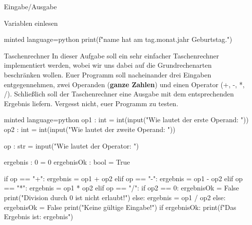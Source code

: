 \begin{task}[points=auto]{Eingabe/Ausgabe }
\begin{subtask*}[points=0]{Variablen einlesen}
\begin{solution}
\begin{codeBlock}[]{minted language=python}
                print(f"{name} hat am {tag}.{monat}.{jahr} Geburtstag.")
            \end{codeBlock}
        \end{solution}
    \end{subtask*}
    \begin{subtask*}[points=0]{Taschenrechner}
        In dieser Aufgabe soll ein sehr einfacher Taschenrechner implementiert werden, wobei wir uns dabei auf die Grundrechenarten beschränken wollen. Euer Programm soll nacheinander drei Eingaben entgegennehmen, zwei Operanden (\textbf{ganze Zahlen}) und einen Operator ({\ttfamily +, -, *, /}). Schließlich soll der Taschenrechner eine Ausgabe mit dem entsprechenden Ergebnis liefern. Vergesst nicht, euer Programm zu testen.

        \begin{solution}
            \begin{codeBlock}[]{minted language=python}
                op1 : int = int(input("Wie lautet der erste Operand: "))
                op2 : int = int(input("Wie lautet der zweite Operand: "))

                op : str = input("Wie lautet der Operator: ")

                ergebnis : 0 = 0
                ergebnisOk : bool = True

                if op == "+":
                    ergebnis = op1 + op2
                elif op == "-":
                    ergebnis = op1 - op2
                elif op == "*":
                    ergebnis = op1 * op2
                elif op == "/":
                    if op2 == 0:
                        ergebnisOk = False
                        print("Division durch 0 ist nicht erlaubt!")
                    else:
                        ergebnis = op1 / op2
                else:
                    ergebnisOk = False
                    print("Keine gültige Eingabe!")
                if ergebnisOk:
                    print(f"Das Ergebnis ist: {ergebnis}")
            \end{codeBlock}
        \end{solution}
    \end{subtask*}
\end{task}
